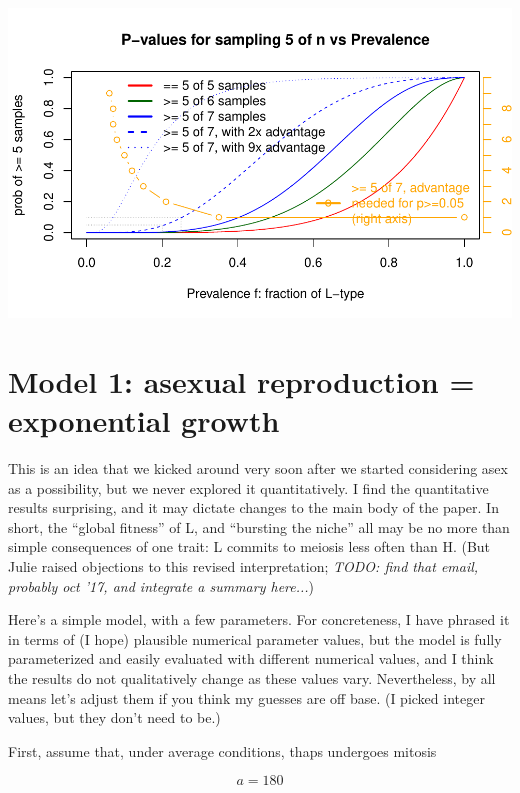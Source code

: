\documentclass{article}\usepackage[]{graphicx}\usepackage[]{color}
\makeatletter
\def\maxwidth{ %
  \ifdim\Gin@nat@width>\linewidth
    \linewidth
  \else
    \Gin@nat@width
  \fi
}
\newenvironment{knitrout}{}{} %
\makeatother
\begin{document}
\begin{knitrout}
{\centering \includegraphics[width=\maxwidth]{asex-figs-knitr/substantial-minority-1} 

}



\end{knitrout}

\section{Model 1: asexual reproduction = exponential growth}
\label{sec:asexpo}

This is an idea that we kicked around very soon after we started considering asex as a possibility,
but we never explored it quantitatively.  I find the quantitative results surprising, and it may
dictate changes to the main body of the paper.  In short, the ``global fitness'' of L, and
``bursting the niche'' all may be no more than simple consequences of one trait: L commits to
meiosis less often than H.  (But Julie raised objections to this revised interpretation;
\textit{TODO: find that email, probably oct '17, and integrate a summary here...})

Here's a simple model, with a few parameters.  For concreteness, I have phrased it in terms of (I
hope) plausible numerical parameter values, but the model is fully parameterized and easily
evaluated with different numerical values, and I think the results do not qualitatively change as
these values vary.  Nevertheless, by all means let's adjust them if you think my guesses are off
base.  (I picked integer values, but they don't need to be.)

First, assume that, under average conditions, thaps undergoes mitosis 

  $$a=180$$
\end{document}
